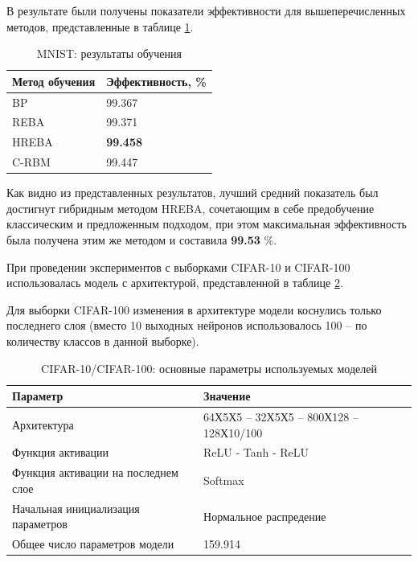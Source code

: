 В результате были получены показатели эффективности для вышеперечисленных методов, представленные в таблице \ref{table:mnist_results}.

\begin{table} [!h]
  \caption{MNIST: результаты обучения}\label{table:mnist_results}
\centering
\begin{tabular}{| p{6cm} | p{6cm} |}
  \hline
    \textbf{Метод обучения} & \textbf{Эффективность, \%}\\
    \hline
    BP & 99.367\\
    \hline
    REBA & 99.371\\
    \hline
    HREBA & \textbf{99.458}\\
    \hline
    C-RBM & 99.447\\
    \hline
\end{tabular}
\end{table}

Как видно из представленных результатов, лучший средний показатель был достигнут гибридным методом HREBA, сочетающим в себе предобучение классическим и предложенным подходом, при этом максимальная эффективность была получена этим же методом и составила \textbf{99.53} \%.

При проведении экспериментов с выборками CIFAR-10 и CIFAR-100 использовалась модель с архитектурой, представленной в таблице \ref{table:cifar_comparison_params}.

Для выборки CIFAR-100 изменения в архитектуре модели коснулись только последнего слоя (вместо 10 выходных нейронов использовалось 100 -- по количеству классов в данной выборке).

\begin{table}[!h]
    \caption{CIFAR-10/CIFAR-100: основные параметры используемых моделей}\label{table:cifar_comparison_params}
    \begin{tabular}{|p{7cm}|p{8cm}|}
        \hline
        \textbf{Параметр} & \textbf{Значение}\\
        \hline
        Архитектура & 64Х5Х5 -- 32Х5Х5 -- 800Х128 -- 128Х10/100\\
        \hline
        Функция активации & ReLU - Tanh - ReLU \\
        \hline
        Функция активации на последнем слое & Softmax \\
        \hline
        Начальная инициализация параметров & Нормальное распредение \\
        \hline
        Общее число параметров модели & 159.914
        \\
        \hline
    \end{tabular}
\end{table}


